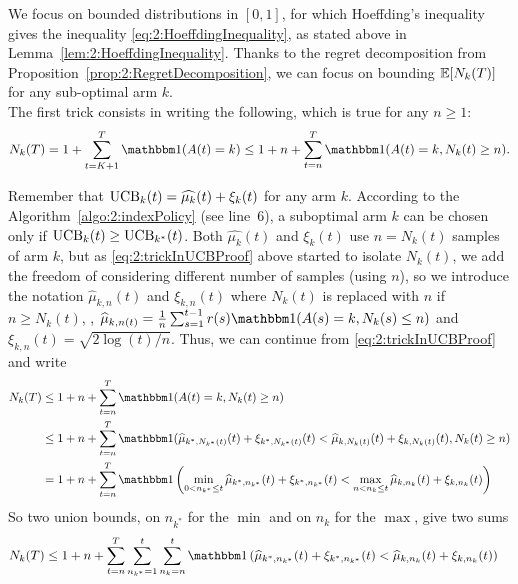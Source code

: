 \begin{smallproof}\label{proof:2:UCBregretBound}
    We focus on bounded distributions in $[0,1]$, for which Hoeffding's inequality gives the inequality \eqref{eq:2:HoeffdingInequality}, as stated above in Lemma~\ref{lem:2:HoeffdingInequality}.
    Thanks to the regret decomposition from Proposition~\ref{prop:2:RegretDecomposition}, we can focus on bounding $\mathbb{E}[N_k(T)]$ for any sub-optimal arm $k$.\\
    \indent
    The first trick consists in writing the following, which is true for any $n \geq 1$:
    \begin{equation}\label{eq:2:trickInUCBProof}
        N_k(T) = 1 + \sum_{t=K+1}^T \indic(A(t) = k)
        \leq 1 + n + \sum_{t=n}^T \indic(A(t) = k, N_k(t) \geq n).
    \end{equation}


    Remember that $\mathrm{UCB}_k(t) = \widehat{\mu_k}(t) + \xi_k(t)$ for any arm $k$.
    According to the Algorithm~\ref{algo:2:indexPolicy} (see line~6),
    a suboptimal arm $k$ can be chosen only if $\mathrm{UCB}_k(t) \geq \mathrm{UCB}_{k^*}(t)$.
    Both $\widehat{\mu_k}(t)$ and $\xi_k(t)$ use $n=N_k(t)$ samples of arm $k$,
    but as \eqref{eq:2:trickInUCBProof} above started to isolate $N_k(t)$, we add the freedom of considering different number of samples (using $n$), so we introduce the notation
    $\widehat{\mu}_{k,n}(t)$ and $\xi_{k,n}(t)$ where $N_k(t)$ is replaced with $n$ if $n \geq N_k(t)$,
    \ie, $\widehat{\mu}_{k,n(t)} = \frac{1}{n} \sum_{s=1}^{t-1} r(s) \indic(A(s)=k, N_k(s) \leq n)$ and $\xi_{k,n}(t) = \sqrt{2\log(t) / n}$.
    Thus, we can continue from \eqref{eq:2:trickInUCBProof} and write
    \begin{align}\label{eq:2:decompositionInUCBProof}
        N_k(T)
        & \leq 1 + n + \sum_{t=n}^T \indic(A(t) = k, N_k(t) \geq n) \nonumber \\
        & \leq 1 + n + \sum_{t=n}^T \indic(\widehat{\mu}_{k^*,N_{k^*}(t)}(t) + \xi_{k^*,N_{k^*}(t)}(t) < \widehat{\mu}_{k,N_k(t)}(t) + \xi_{k,N_k(t)}(t), N_k(t) \geq n)  \nonumber \\
        & = 1 + n + \sum_{t=n}^T \indic\left(\min_{0 < n_{k^*} \leq t} \widehat{\mu}_{k^*,n_{k^*}}(t) + \xi_{k^*,n_{k^*}}(t) < \max_{n < n_k \leq t} \widehat{\mu}_{k,n_k}(t) + \xi_{k,n_k}(t) \right)
    \end{align}
    So two union bounds, on $n_{k^*}$ for the $\min$ and on $n_k$ for the $\max$, give two sums
    \begin{align}\label{eq:2:decompositionInUCBProof2}
        N_k(T)
        & \leq 1 + n + \sum_{t=n}^T \sum_{n_{k^*}=1}^t \sum_{n_{k}=n}^t  \indic\left( \widehat{\mu}_{k^*,n_{k^*}}(t) + \xi_{k^*,n_{k^*}}(t) < \widehat{\mu}_{k,n_k}(t) + \xi_{k,n_k}(t) \right)
    \end{align}


\end{smallproof}

